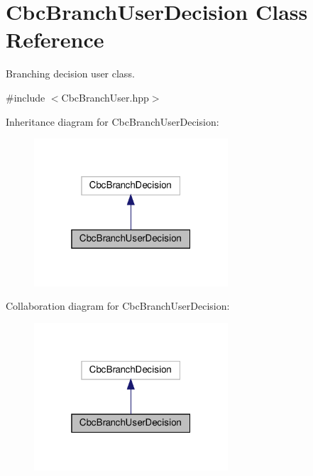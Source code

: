 \hypertarget{classCbcBranchUserDecision}{}\section{Cbc\+Branch\+User\+Decision Class Reference}
\label{classCbcBranchUserDecision}


Branching decision user class.  




{\ttfamily \#include $<$Cbc\+Branch\+User.\+hpp$>$}



Inheritance diagram for Cbc\+Branch\+User\+Decision\+:
\nopagebreak
\begin{figure}[H]
\begin{center}
\leavevmode
\includegraphics[width=205pt]{dd/dfb/classCbcBranchUserDecision__inherit__graph}
\end{center}
\end{figure}


Collaboration diagram for Cbc\+Branch\+User\+Decision\+:
\nopagebreak
\begin{figure}[H]
\begin{center}
\leavevmode
\includegraphics[width=205pt]{d2/d80/classCbcBranchUserDecision__coll__graph}
\end{center}
\end{figure}
